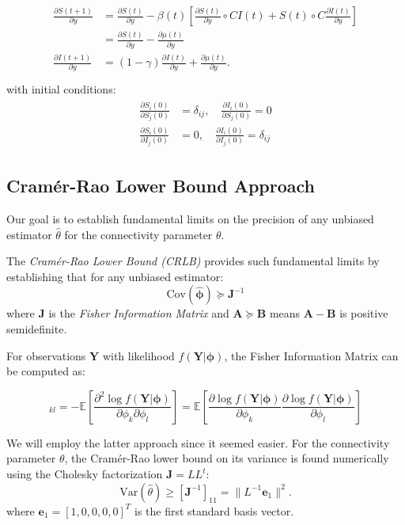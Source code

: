 \begin{align}\begin{split}
  \frac{\partial S(t+1)}{\partial y} &= \frac{\partial S(t)}{\partial
  y} - \beta(t) \left[ \frac{\partial S(t)}{\partial y} \circ CI(t) +
  S(t)\circ C \frac{\partial I(t)}{\partial y} \right] \\
  & = \frac{\partial S(t)}{\partial y} - \frac{\partial \mu(t)}{\partial y} \\
  \frac{\partial I(t+1)}{\partial y} &= (1-\gamma) \frac{\partial
  I(t)}{\partial y} + \frac{\partial \mu(t)}{\partial y}.\\
\end{split}\end{align}        
with initial conditions:
\begin{align}\begin{split}
\frac{\partial S_i(0)}{\partial S_j(0)} &= \delta_{ij}, \quad \frac{\partial I_i(0)}{\partial S_j(0)} = 0 \\
%
%
%
\frac{\partial S_i(0)}{\partial I_j(0)} &= 0, \quad \frac{\partial I_i(0)}{\partial I_j(0)} = \delta_{ij}
\end{split}\end{align}



\subsection{Cramér-Rao Lower Bound Approach}
Our goal is to establish fundamental limits on the precision of any
unbiased estimator $\hat{\theta}$ for the connectivity parameter
$\theta$.

The \emph{Cramér-Rao Lower Bound (CRLB)} provides such fundamental
limits by establishing that for any unbiased estimator:
\begin{equation}
\text{Cov}(\hat{\boldsymbol{\phi}}) \succeq \mathbf{J}^{-1}
\end{equation}
where $\mathbf{J}$ is the \emph{Fisher Information Matrix} and $\mathbf{A} \succeq \mathbf{B}$ means $\mathbf{A} - \mathbf{B}$ is positive semidefinite.

For observations $\mathbf{Y}$ with likelihood
$f(\mathbf{Y}|\boldsymbol{\phi})$, the Fisher Information Matrix can
be computed as:

\begin{equation}
[\mathbf{J}]_{kl} = -\mathbb{E}\left[\frac{\partial^2 \log
    f(\mathbf{Y}|\boldsymbol{\phi})}{\partial \phi_k \partial
    \phi_l}\right] = \mathbb{E}\left[\frac{\partial \log
    f(\mathbf{Y}|\boldsymbol{\phi})}{\partial \phi_k}\frac{\partial
    \log f(\mathbf{Y}|\boldsymbol{\phi})}{\partial \phi_l}\right]
\end{equation}

We will employ the latter approach since it seemed easier. For the
connectivity parameter $\theta$, the Cramér-Rao lower bound on its
variance is found numerically using the Cholesky factorization
$\mathbf{J} = LL^t$:
\begin{equation*}
\text{Var}(\hat{\theta}) \geq [\mathbf{J}^{-1}]_{11} = \|L^{-1}\mathbf{e}_1\|^2.
\end{equation*}
where $\mathbf{e}_1 = [1, 0, 0, 0, 0]^T$ is the first standard basis vector.
